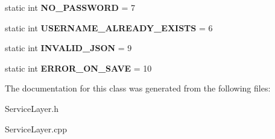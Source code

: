 \begin{DoxyCompactItemize}
\item 
\hypertarget{classServiceLayer_ab4e8306edb3904639e9884ff1d48578c}{static int {\bfseries N\-O\-\_\-\-P\-A\-S\-S\-W\-O\-R\-D} = 7}\label{classServiceLayer_ab4e8306edb3904639e9884ff1d48578c}

\item 
\hypertarget{classServiceLayer_adb5e8613d24bf9634b568f2958fbcb96}{static int {\bfseries U\-S\-E\-R\-N\-A\-M\-E\-\_\-\-A\-L\-R\-E\-A\-D\-Y\-\_\-\-E\-X\-I\-S\-T\-S} = 6}\label{classServiceLayer_adb5e8613d24bf9634b568f2958fbcb96}

\item 
\hypertarget{classServiceLayer_a3b13f26199c41e3fc09ecc6c9d44b604}{static int {\bfseries I\-N\-V\-A\-L\-I\-D\-\_\-\-J\-S\-O\-N} = 9}\label{classServiceLayer_a3b13f26199c41e3fc09ecc6c9d44b604}

\item 
\hypertarget{classServiceLayer_a2138d03937561da9c364c93bef98879b}{static int {\bfseries E\-R\-R\-O\-R\-\_\-\-O\-N\-\_\-\-S\-A\-V\-E} = 10}\label{classServiceLayer_a2138d03937561da9c364c93bef98879b}

\end{DoxyCompactItemize}


The documentation for this class was generated from the following files\-:\begin{DoxyCompactItemize}
\item 
Service\-Layer.\-h\item 
Service\-Layer.\-cpp\end{DoxyCompactItemize}
